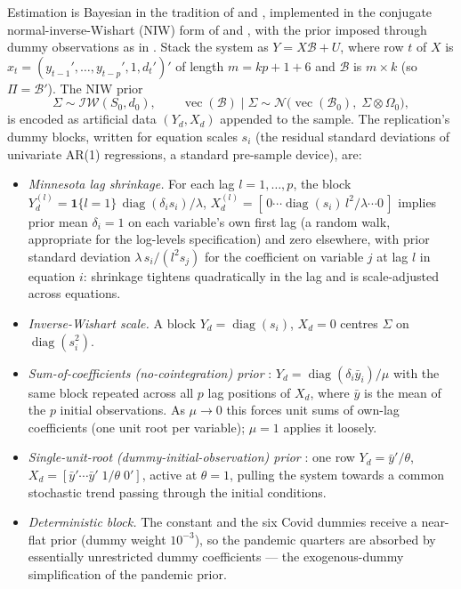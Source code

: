Estimation is Bayesian in the tradition of \citet{doan1984} and \citet{litterman1986}, implemented in the conjugate normal-inverse-Wishart (NIW) form of \citet{kadiyala1997} and \citet{giannone2015}, with the prior imposed through dummy observations as in \citet{sims1998}. Stack the system as $Y = X\mathcal{B} + U$, where row $t$ of $X$ is $x_t = (y_{t-1}',\ldots,y_{t-p}',1,d_t')'$ of length $m = kp + 1 + 6$ and $\mathcal{B}$ is $m \times k$ (so $\Pi = \mathcal{B}'$). The NIW prior
\begin{equation}
\Sigma \sim \mathcal{IW}(S_0, d_0), \qquad
\operatorname{vec}(\mathcal{B}) \mid \Sigma \sim \mathcal{N}\!\big(\operatorname{vec}(\mathcal{B}_0),\; \Sigma \otimes \Omega_0\big),
\end{equation}
is encoded as artificial data $(Y_d, X_d)$ appended to the sample. The replication's dummy blocks, written for equation scales $s_i$ (the residual standard deviations of univariate AR(1) regressions, a standard pre-sample device), are:
\begin{itemize}
\item \emph{Minnesota lag shrinkage.} For each lag $l = 1,\ldots,p$, the block $Y_d^{(l)} = \mathbf{1}\{l{=}1\}\,\operatorname{diag}(\delta_i s_i)/\lambda$, $X_d^{(l)} = [\,0 \cdots \operatorname{diag}(s_i)\, l^{2}/\lambda \cdots 0\,]$ implies prior mean $\delta_i = 1$ on each variable's own first lag (a random walk, appropriate for the log-levels specification) and zero elsewhere, with prior standard deviation $\lambda\, s_i / (l^{2} s_j)$ for the coefficient on variable $j$ at lag $l$ in equation $i$: shrinkage tightens quadratically in the lag and is scale-adjusted across equations.
\item \emph{Inverse-Wishart scale.} A block $Y_d = \operatorname{diag}(s_i)$, $X_d = 0$ centres $\Sigma$ on $\operatorname{diag}(s_i^2)$.
\item \emph{Sum-of-coefficients (no-cointegration) prior} \citep{doan1984}: $Y_d = \operatorname{diag}(\delta_i \bar{y}_i)/\mu$ with the same block repeated across all $p$ lag positions of $X_d$, where $\bar{y}$ is the mean of the $p$ initial observations. As $\mu \to 0$ this forces unit sums of own-lag coefficients (one unit root per variable); $\mu = 1$ applies it loosely.
\item \emph{Single-unit-root (dummy-initial-observation) prior} \citep{sims1998}: one row $Y_d = \bar{y}'/\theta$, $X_d = [\bar{y}' \cdots \bar{y}'\; 1/\theta\; 0']$, active at $\theta = 1$, pulling the system towards a common stochastic trend passing through the initial conditions.
\item \emph{Deterministic block.} The constant and the six Covid dummies receive a near-flat prior (dummy weight $10^{-3}$), so the pandemic quarters are absorbed by essentially unrestricted dummy coefficients --- the exogenous-dummy simplification of the \citet{cascaldigarcia2022} pandemic prior.
\end{itemize}
